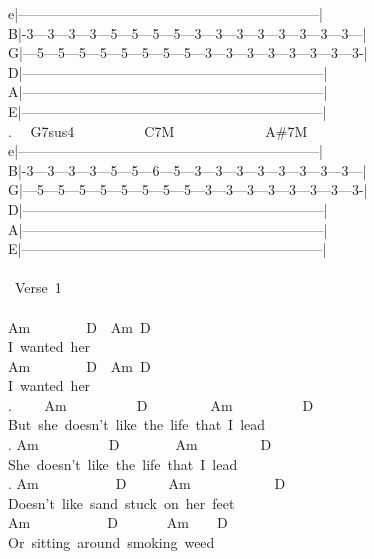 {e|-----------------------------------------------------------------|\\
B|-3---3---3---3---5---5---5---5---3---3---3---3---3---3---3---3---|\\
G|---5---5---5---5---5---5---5---5---3---3---3---3---3---3---3---3-|\\
D|-----------------------------------------------------------------|\\
A|-----------------------------------------------------------------|\\
E|-----------------------------------------------------------------|\\
. \ \ G7sus4\ \ \ \ \ \ \ \ \ \ C7M\ \ \ \ \ \ \ \ \ \ \ \ \ A\#7M\\
e|-----------------------------------------------------------------|\\
B|-3---3---3---3---5---5---6---5---3---3---3---3---3---3---3---3---|\\
G|---5---5---5---5---5---5---5---5---3---3---3---3---3---3---3---3-|\\
D|-----------------------------------------------------------------|\\
A|-----------------------------------------------------------------|\\
E|-----------------------------------------------------------------|\\
\\
\lbrack\ Verse\ 1\rbrack\\
\\
Am\ \ \ \ \ \ \ \ D\ \ Am\ D\\
I\ wanted\ her\\
Am\ \ \ \ \ \ \ \ D\ \ Am\ D\\
I\ wanted\ her\\
. \ \ \ \ Am\ \ \ \ \ \ \ \ \ \ D\ \ \ \ \ \ \ \ \ Am\ \ \ \ \ \ \ \ \ \ D\\
But\ she\ doesn't\ like\ the\ life\ that\ I\ lead\\
. Am\ \ \ \ \ \ \ \ \ \ D\ \ \ \ \ \ \ \ Am\ \ \ \ \ \ \ \ \ D\\
She\ doesn't\ like\ the\ life\ that\ I\ lead\\
. Am\ \ \ \ \ \ \ \ \ \ \ D\ \ \ \ \ \ Am\ \ \ \ \ \ \ \ \ \ \ \ D\\
Doesn't\ like\ sand\ stuck\ on\ her\ feet\\
Am\ \ \ \ \ \ \ \ \ \ \ D\ \ \ \ \ \ \ Am\ \ \ \ D\\
Or\ sitting\ around\ smoking\ weed\\
}
